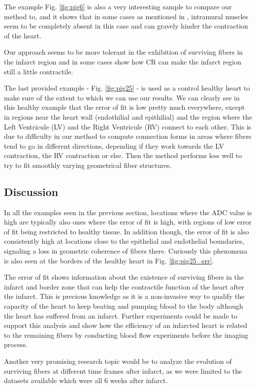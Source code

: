 The example Fig. \ref{fig:pig6} is also a very interesting sample to compare our method to, and it shows that in some cases as mentioned in \cite{ursell1985structural}, intramural muscles seem to be completely absent in this case and can gravely hinder the contraction of the heart.

Our approach seems to be more tolerant in the exhibition of surviving fibers in the infarct region and in some cases show how CR can make the infarct region still a little contractile.

The last provided example - Fig. \ref{fig:pig25} - is used as a control healthy heart to make sure of the extent to which we can use our results. We can clearly see in this healthy example that the error of fit is low pretty much everywhere, except in regions near the heart wall (endothilial and epithilial) and the region where the Left Ventricule (LV) and the Right Ventricule (RV) connect to each other. This is due to difficulty in our method to compute connection forms in areas where fibers tend to go in different directions, depending if they work towards the LV contraction, the RV contraction or else. Then the method performs less well to try to fit smoothly varying geometrical fiber structures.

\subsection{Discussion}

In all the examples seen in the previous section, locations where the ADC value is high are typically also ones where the error of fit is high, with regions of low error of fit being restricted to healthy tissue. In addition though, the error of fit is also consistently high at locations close to the epithelial and endothelial boundaries, signaling a loss in geometric coherence of fibers there. Curiously this phenomena is also seen at the borders of the healthy heart in Fig. \ref{fig:pig25_err}.

The error of fit shows information about the existence of surviving fibers in the infarct and border zone that can help the contractile function of the heart after the infarct. This is precious knowledge as it is a non-invasive way to qualify the capacity of the heart to keep beating and pumping blood to the body although the heart has suffered from an infarct. Further experiments could be made to support this analysis and show how the efficiency of an infarcted heart is related to the remaining fibers by conducting blood flow experiments before the imaging process.

Another very promising research topic would be to analyze the evolution of surviving fibers at different time frames after infarct, as we were limited to the datasets available which were all 6 weeks after infarct.
